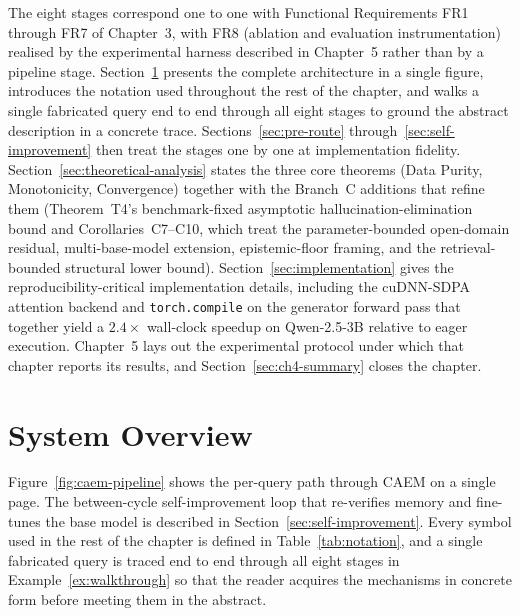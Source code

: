 The eight stages correspond one to one with Functional Requirements FR1 through FR7 of Chapter~3, with FR8 (ablation and evaluation instrumentation) realised by the experimental harness described in Chapter~5 rather than by a pipeline stage. Section~\ref{sec:system-overview} presents the complete architecture in a single figure, introduces the notation used throughout the rest of the chapter, and walks a single fabricated query end to end through all eight stages to ground the abstract description in a concrete trace. Sections~\ref{sec:pre-route} through~\ref{sec:self-improvement} then treat the stages one by one at implementation fidelity. Section~\ref{sec:theoretical-analysis} states the three core theorems (Data Purity, Monotonicity, Convergence) together with the Branch~C additions that refine them (Theorem~T4's benchmark-fixed asymptotic hallucination-elimination bound and Corollaries~C7--C10, which treat the parameter-bounded open-domain residual, multi-base-model extension, epistemic-floor framing, and the retrieval-bounded structural lower bound). Section~\ref{sec:implementation} gives the reproducibility-critical implementation details, including the cuDNN-SDPA attention backend and \texttt{torch.compile} on the generator forward pass that together yield a $2.4\times$ wall-clock speedup on Qwen-2.5-3B relative to eager execution. Chapter~5 lays out the experimental protocol under which that chapter reports its results, and Section~\ref{sec:ch4-summary} closes the chapter.

\section{System Overview}
\label{sec:system-overview}

Figure~\ref{fig:caem-pipeline} shows the per-query path through CAEM on a single page. The between-cycle self-improvement loop that re-verifies memory and fine-tunes the base model is described in Section~\ref{sec:self-improvement}. Every symbol used in the rest of the chapter is defined in Table~\ref{tab:notation}, and a single fabricated query is traced end to end through all eight stages in Example~\ref{ex:walkthrough} so that the reader acquires the mechanisms in concrete form before meeting them in the abstract.

